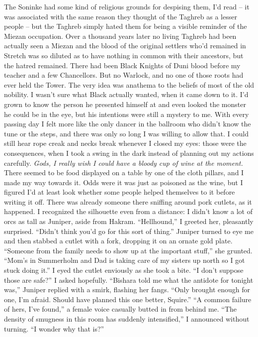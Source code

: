 \documentclass[12pt, openany]{book}
\begin{document}
The Soninke had some kind of religious grounds for despising them, I’d read – it was associated with the same reason they thought of the Taghreb as a lesser people – but the Taghreb simply hated them for being a visible reminder of the Miezan occupation. Over a thousand years later no living Taghreb had been actually seen a Miezan and the blood of the original settlers who’d remained in Stretch was so diluted as to have nothing in common with their ancestors, but the hatred remained. There had been Black Knights of Duni blood before my teacher and a few Chancellors. But no Warlock, and no one of those roots had ever held the Tower. The very idea was anathema to the beliefs of most of the old nobility.
I wasn’t sure what Black actually wanted, when it came down to it. I’d grown to know the person he presented himself at and even looked the monster he could be in the eye, but his intentions were still a mystery to me. With every passing day I felt more like the only dancer in the ballroom who didn’t know the tune or the steps, and there was only so long I was willing to allow that. I could still hear rope creak and necks break whenever I closed my eyes: those were the consequences, when I took a swing in the dark instead of planning out my actions carefully. \textit{Gods, I really wish I could have a bloody cup of wine at the moment. }There seemed to be food displayed on a table by one of the cloth pillars, and I made my way towards it. Odds were it was just as poisoned as the wine, but I figured I’d at least look whether some people helped themselves to it before writing it off. There was already someone there sniffing around pork cutlets, as it happened. I recognized the silhouette even from a distance: I didn’t know a lot of orcs as tall as Juniper, aside from Hakram.
“Hellhound,” I greeted her, pleasantly surprised. “Didn’t think you’d go for this sort of thing.”
Juniper turned to eye me and then stabbed a cutlet with a fork, dropping it on an ornate gold plate.
“Someone from the family needs to show up at the important stuff,” she grunted. “Mom’s in Summerholm and Dad is taking care of my sisters up north so I got stuck doing it.”
I eyed the cutlet enviously as she took a bite.
“I don’t suppose those are safe?” I asked hopefully.
“Bishara told me what the antidote for tonight was,” Juniper replied with a smirk, flashing her fangs. “Only brought enough for one, I’m afraid. Should have planned this one better, Squire.”
“A common failure of hers, I’ve found,” a female voice casually butted in from behind me.
“The density of smugness in this room has suddenly intensified,” I announced without turning. “I wonder why that is?”
\end{document}
